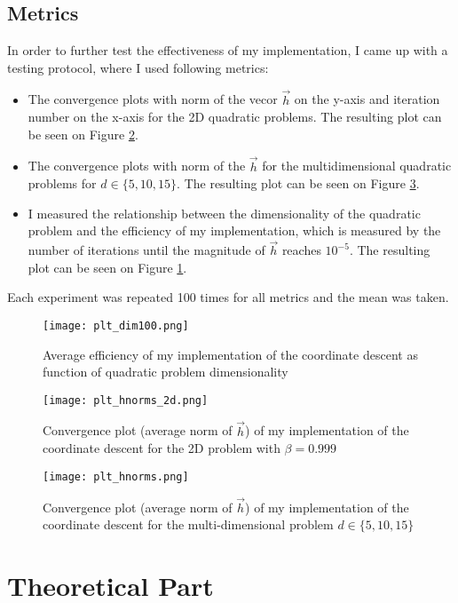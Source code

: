 \documentclass[a4paper]{article}
\begin{document}
\subsection{Metrics}
In order to further test the effectiveness of my implementation, I came up with a
testing protocol, where I used following metrics:
\begin{itemize}
\item The convergence plots with norm of the vecor $\vec{h}$ on the y-axis and
  iteration number on the x-axis for the 2D quadratic problems.
  The resulting plot can be seen on Figure \ref{plt2}.
\item The convergence plots with norm of the $\vec{h}$ for the multidimensional
  quadratic problems for $d \in \{5, 10, 15\}$. The resulting plot can be seen
  on Figure \ref{plt3}.
\item I measured the relationship between the dimensionality of the quadratic
  problem and the efficiency of my implementation, which is measured by the
  number of iterations until the magnitude of $\vec{h}$ reaches $10^{-5}$. The
  resulting plot can be seen on Figure \ref{plt1}.
\end{itemize}
Each experiment was repeated 100 times for all metrics and the mean was taken.

\begin{figure}[H]
    \centering
    \texttt{[image: plt\_dim100.png]}
    \caption{Average efficiency of my implementation of the coordinate descent
      as function of quadratic problem dimensionality}
  \label{plt1}
\end{figure}

\begin{figure}[H]
    \centering
    \texttt{[image: plt\_hnorms\_2d.png]}
    \caption{Convergence plot (average norm of $\vec{h}$) of my implementation of the coordinate descent
      for the 2D problem with $\beta = 0.999$}
  \label{plt2}
\end{figure}

\begin{figure}[H]
    \centering
    \texttt{[image: plt\_hnorms.png]}
    \caption{Convergence plot (average norm of $\vec{h}$) of my implementation of the
      coordinate descent for the multi-dimensional problem $d \in \{ 5,10,15\}$}
  \label{plt3}
\end{figure}

\section{Theoretical Part}
\end{document}
